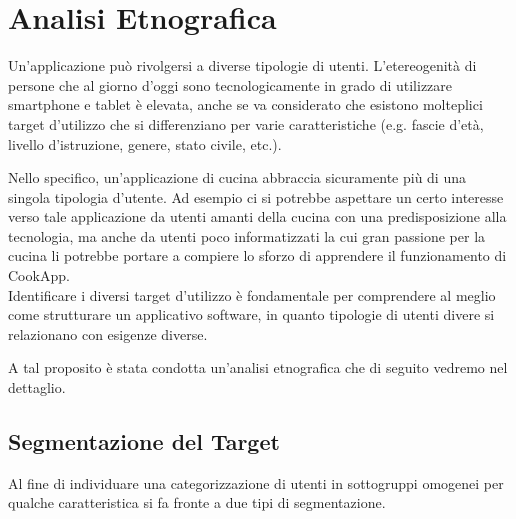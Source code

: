 \section{Analisi Etnografica}
Un'applicazione può rivolgersi a diverse tipologie di utenti.
L'etereogenità di persone che al giorno d'oggi sono tecnologicamente in
grado di utilizzare smartphone e tablet è elevata, anche se va
considerato che esistono molteplici target d'utilizzo che si
differenziano per varie caratteristiche (e.g. fascie d'età, livello
d'istruzione, genere, stato civile, etc.).

Nello specifico, un'applicazione di cucina abbraccia sicuramente più di
una singola tipologia d'utente. 
Ad esempio ci si potrebbe aspettare un certo interesse verso tale applicazione
da utenti amanti della cucina con una predisposizione alla tecnologia, ma
anche da utenti poco informatizzati la cui gran passione per la cucina
li potrebbe portare a compiere lo sforzo di
apprendere il funzionamento di CookApp. \\

Identificare i diversi target d'utilizzo è fondamentale per comprendere
al meglio come strutturare un applicativo software, in quanto tipologie
di utenti divere si relazionano con esigenze diverse.

A tal proposito è stata condotta un'analisi etnografica che di seguito vedremo nel dettaglio. 

\subsection{Segmentazione del Target}
Al fine di individuare una categorizzazione di utenti in sottogruppi
omogenei per qualche caratteristica si fa fronte a due tipi di
segmentazione.

